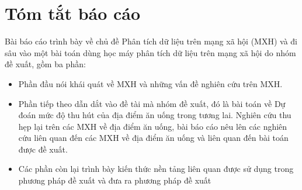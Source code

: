 \documentclass[12pt]{extarticle}
\begin{document}


	\newpage
	\thispagestyle{empty}
	\tableofcontents
	\newpage	
	\listoffigures
	\newpage
	\listoftables
	\newpage
	\section{Tóm tắt báo cáo}	
		\par Bài báo cáo trình bày về chủ đề Phân tích dữ liệu trên mạng xã hội (MXH) và đi sâu vào một bài toán dùng học máy phân tích dữ liệu trên mạng xã hội do nhóm đề xuất, gồm ba phần:
		\begin{itemize}

		\item{Phần đầu nói khái quát về MXH và những vấn đề nghiên cứu trên MXH.}	

		\item{Phần tiếp theo dẫn dắt vào đề tài mà nhóm đề xuất, đó là bài toán về Dự đoán mức độ thu hút của địa điểm ăn uống trong tương lai. Nghiên cứu thu hẹp lại trên các MXH về địa điểm ăn uống, bài báo cáo nêu lên các nghiên cứu liên quan đến các MXH về địa điểm ăn uống và liên quan đến bài toán được đề xuất.}

		\item{Các phần còn lại trình bày kiến thức nền tảng liên quan được sử dụng trong phương pháp đề xuất và đưa ra phương pháp đề xuất}


		\end{itemize}
\end{document}
